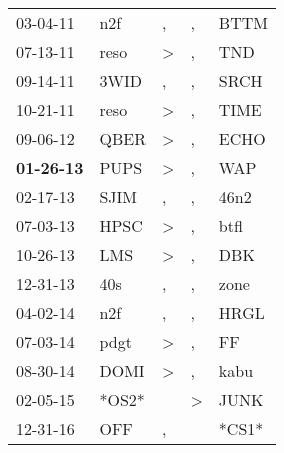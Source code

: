\begin{supertabular}{p{0.07\textwidth}p{0.06\textwidth}p{0.02\textwidth}p{0.02\textwidth}p{0.06\textwidth}}
          03-04-11\textsuperscript{} &            n2f\textsuperscript{} &                , &             , &           BTTM\textsuperscript{} \\
          07-13-11\textsuperscript{} &           reso\textsuperscript{} &     \textgreater &             , &            TND\textsuperscript{} \\
          09-14-11\textsuperscript{} &           3WID\textsuperscript{} &                , &             , &           SRCH\textsuperscript{} \\
          10-21-11\textsuperscript{} &           reso\textsuperscript{} &     \textgreater &             , &           TIME\textsuperscript{} \\
          09-06-12\textsuperscript{} &           QBER\textsuperscript{} &     \textgreater &             , &           ECHO\textsuperscript{} \\
 \textbf{01-26-13\textsuperscript{}} &           PUPS\textsuperscript{} &     \textgreater &             , &            WAP\textsuperscript{} \\
          02-17-13\textsuperscript{} &           SJIM\textsuperscript{} &                , &             , &           46n2\textsuperscript{} \\
          07-03-13\textsuperscript{} &           HPSC\textsuperscript{} &     \textgreater &             , &           btfl\textsuperscript{} \\
          10-26-13\textsuperscript{} &            LMS\textsuperscript{} &     \textgreater &             , &            DBK\textsuperscript{} \\
          12-31-13\textsuperscript{} &            40s\textsuperscript{} &                , &             , &           zone\textsuperscript{} \\
          04-02-14\textsuperscript{} &            n2f\textsuperscript{} &                , &             , &           HRGL\textsuperscript{} \\
          07-03-14\textsuperscript{} &           pdgt\textsuperscript{} &     \textgreater &             , &             FF\textsuperscript{} \\
          08-30-14\textsuperscript{} &           DOMI\textsuperscript{} &     \textgreater &             , &           kabu\textsuperscript{} \\
          02-05-15\textsuperscript{} &                            *OS2* &                  &  \textgreater &           JUNK\textsuperscript{} \\
          12-31-16\textsuperscript{} &            OFF\textsuperscript{} &                , &               &                            *CS1* \\

\end{supertabular}
